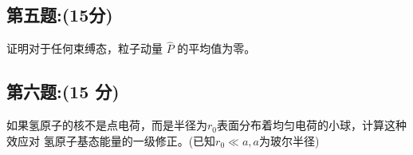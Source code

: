 \subsection{第五题:(15分)}
证明对于任何束缚态，粒子动量 $\hat{P}$ 的平均值为零。
\subsection{第六题:(15 分)}
如果氢原子的核不是点电荷，而是半径为$r_0$表面分布着均匀电荷的小球，计算这种效应对
氢原子基态能量的一级修正。(已知$r_0 \ll a,a$为玻尔半径)